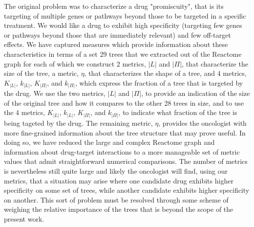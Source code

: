 \documentclass{article}
\begin{document}
The original problem was to characterize a drug "promiscuity", that is its targeting of multiple genes or pathways beyond those to be targeted in a specific treatment. We would like a drug to exhibit high specificity (targeting few genes or pathways beyond those that are immediately relevant) and few off-target effects. We have captured measures which provide information about these characteristics in terms of a set 29 trees that we extracted out of the Reactome graph for each of which we construct 2 metrics, $|L|$ and $|\Pi|$, that characterize the size of the tree, a metric, $\eta$, that characterizes the shape of a tree, and 4 metrics, $K_{|L|}$, $k_{|L|}$, $K_{|\Pi|}$, and $k_{|\Pi|}$, which express the fraction of a tree that is targeted by the drug. We use the two metrics, $|L|$ and $|\Pi|$, to provide an indication of the size of the original tree and how it compares to the other 28 trees in size, and to use the 4 metrics, $K_{|L|}$, $k_{|L|}$, $K_{|\Pi|}$, and $k_{|\Pi|}$, to indicate what fraction of the tree is being tageted by the drug. The remaining metric, $\eta$, provides the oncologist with more fine-grained information about the tree structure that may prove useful. In doing so, we have reduced the large and complex Reactome graph and information about drug-target interactions to a more manageable set of metric values that admit straightforward numerical comparisons. The number of metrics is nevertheless still quite large and likely the oncologist will find, using our metrics, that a situation may arise where one candidate drug exhibits higher specificity on some set of trees, while another candidate exhibits higher specificity on another. This sort of problem must be resolved through some scheme of weighing the relative importance of the trees that is beyond the scope of the present work.

\printbibliography

\pagebreak
	
\end{document}
